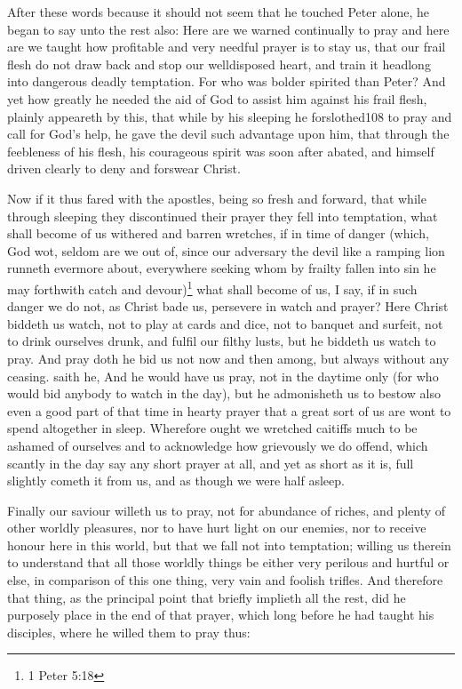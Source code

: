 \documentclass[a5paper]{scrbook}
\begin{document}
	After these words because it should not seem that he touched Peter alone, he began to say unto the rest also:  Here are we warned continually to pray and here are we taught how profitable and very needful prayer is to stay us, that our frail flesh do not draw back and stop our welldisposed heart, and train it headlong into dangerous deadly temptation. For who was bolder spirited than Peter? And yet how greatly he needed the aid of God to assist him against his frail flesh, plainly appeareth by this, that while by his sleeping he forslothed108 to pray and call for God's help, he gave the devil such advantage upon him, that through the feebleness of his flesh, his courageous spirit was soon after abated, and himself driven clearly to deny and forswear Christ.
	
	Now if it thus fared with the apostles, being so fresh and forward, that while through sleeping they discontinued their prayer they fell into temptation, what shall become of us withered and barren wretches, if in time of danger (which, God wot, seldom are we out of, since our adversary the devil like a ramping lion runneth evermore about, everywhere seeking whom by frailty fallen into sin he may forthwith catch and devour)\footnote{1 Peter 5:18} what shall become of us, I say, if in such danger we do not, as Christ bade us, persevere in watch and prayer? Here Christ biddeth us watch, not to play at cards and dice, not to banquet and surfeit, not to drink ourselves drunk, and fulfil our filthy lusts, but he biddeth us watch to pray. And pray doth he bid us not now and then among, but always without any ceasing.  saith he,  And he would have us pray, not in the daytime only (for who would bid anybody to watch in the day), but he admonisheth us to bestow also even a good part of that time in hearty prayer that a great sort of us are wont to spend altogether in sleep. Wherefore ought we wretched caitiffs much to be ashamed of ourselves and to acknowledge how grievously we do offend, which scantly in the day say any short prayer at all, and yet as short as it is, full slightly cometh it from us, and as though we were half asleep.
	
	Finally our saviour willeth us to pray, not for abundance of riches, and plenty of other worldly pleasures, nor to have hurt light on our enemies, nor to receive honour here in this world, but that we fall not into temptation; willing us therein to understand that all those worldly things be either very perilous and hurtful or else, in comparison of this one thing, very vain and foolish trifles. And therefore that thing, as the principal point that briefly implieth all the rest, did he purposely place in the end of that prayer, which long before he had taught his disciples, where he willed them to pray thus: 
	
\end{document}
